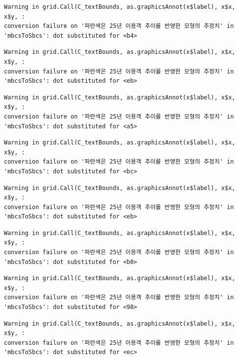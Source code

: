 \documentclass[
  letterpaper,
  DIV=11,
  numbers=noendperiod]{scrreprt}
\begin{document}
\begin{verbatim}
Warning in grid.Call(C_textBounds, as.graphicsAnnot(x$label), x$x, x$y, :
conversion failure on '파란색은 25년 이용객 추이를 반영한 모형의 추정치' in
'mbcsToSbcs': dot substituted for <b4>
\end{verbatim}

\begin{verbatim}
Warning in grid.Call(C_textBounds, as.graphicsAnnot(x$label), x$x, x$y, :
conversion failure on '파란색은 25년 이용객 추이를 반영한 모형의 추정치' in
'mbcsToSbcs': dot substituted for <eb>
\end{verbatim}

\begin{verbatim}
Warning in grid.Call(C_textBounds, as.graphicsAnnot(x$label), x$x, x$y, :
conversion failure on '파란색은 25년 이용객 추이를 반영한 모형의 추정치' in
'mbcsToSbcs': dot substituted for <a5>
\end{verbatim}

\begin{verbatim}
Warning in grid.Call(C_textBounds, as.graphicsAnnot(x$label), x$x, x$y, :
conversion failure on '파란색은 25년 이용객 추이를 반영한 모형의 추정치' in
'mbcsToSbcs': dot substituted for <bc>
\end{verbatim}

\begin{verbatim}
Warning in grid.Call(C_textBounds, as.graphicsAnnot(x$label), x$x, x$y, :
conversion failure on '파란색은 25년 이용객 추이를 반영한 모형의 추정치' in
'mbcsToSbcs': dot substituted for <eb>
\end{verbatim}

\begin{verbatim}
Warning in grid.Call(C_textBounds, as.graphicsAnnot(x$label), x$x, x$y, :
conversion failure on '파란색은 25년 이용객 추이를 반영한 모형의 추정치' in
'mbcsToSbcs': dot substituted for <b0>
\end{verbatim}

\begin{verbatim}
Warning in grid.Call(C_textBounds, as.graphicsAnnot(x$label), x$x, x$y, :
conversion failure on '파란색은 25년 이용객 추이를 반영한 모형의 추정치' in
'mbcsToSbcs': dot substituted for <98>
\end{verbatim}

\begin{verbatim}
Warning in grid.Call(C_textBounds, as.graphicsAnnot(x$label), x$x, x$y, :
conversion failure on '파란색은 25년 이용객 추이를 반영한 모형의 추정치' in
'mbcsToSbcs': dot substituted for <ec>
\end{verbatim}
\end{document}
